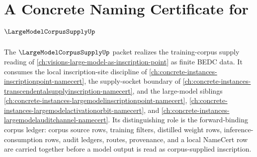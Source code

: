 \chapter{A Concrete Naming Certificate for $\LargeModelCorpusSupplyUp$}
\label{ch:concrete-instances-largemodelcorpussupply-namecert}

The $\LargeModelCorpusSupplyUp$ packet realizes the training-corpus supply reading of \autoref{ch:visions-large-model-as-inscription-point} as finite BEDC data. It consumes the local inscription-site discipline of \autoref{ch:concrete-instances-inscriptionpoint-namecert}, the supply-socket boundary of \autoref{ch:concrete-instances-transcendentalsupplyinscription-namecert}, and the large-model siblings \autoref{ch:concrete-instances-largemodelinscriptionpoint-namecert}, \autoref{ch:concrete-instances-largemodelactivationorbit-namecert}, and \autoref{ch:concrete-instances-largemodelauditchannel-namecert}. Its distinguishing role is the forward-binding corpus ledger: corpus source rows, training filters, distilled weight rows, inference-consumption rows, audit ledgers, routes, provenance, and a local NameCert row are carried together before a model output is read as corpus-supplied inscription.

